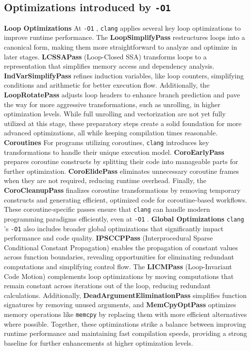 \documentclass{rapport}
\newcommand{\clang}{\texttt{clang} }
\newcommand{\optione}{\texttt{-O1} }
\begin{document}
\subsection*{Optimizations introduced by \optione}
\textbf{Loop Optimizations} \newline
At \optione, \clang applies several key loop optimizations to improve runtime performance. The \textbf{LoopSimplifyPass} restructures loops into a canonical form, making them more 
straightforward to analyze and optimize in later stages. \textbf{LCSSAPass} (Loop-Closed SSA) transforms loops to a representation that simplifies memory access and dependency analysis. 
\textbf{IndVarSimplifyPass} refines induction variables, like loop counters, simplifying conditions and arithmetic for better execution flow. Additionally, the \textbf{LoopRotatePass} 
adjusts loop headers to enhance branch prediction and pave the way for more aggressive transformations, such as unrolling, in higher optimization levels. 
While full unrolling and vectorization are not yet fully utilized at this stage, these preparatory steps create a solid foundation for more advanced optimizations, 
all while keeping compilation times reasonable.
\newline\newline
\textbf{Coroutines}\newline
For programs utilizing coroutines, \clang introduces key transformations to handle their unique execution model. 
\textbf{CoroEarlyPass} prepares coroutine constructs by splitting their code into manageable parts for further optimization. 
\textbf{CoroElidePass} eliminates unnecessary coroutine frames when they are not required, reducing runtime overhead. 
Finally, the \textbf{CoroCleanupPass} finalizes coroutine transformations by removing temporary constructs and generating efficient, optimized code for 
coroutine-based workflows. These coroutine-specific passes ensure that \clang can handle modern programming paradigms efficiently, even at \optione.
\newline\newline
\textbf{Global Optimizations}\newline
\clang’s \optione also includes broader global optimizations that significantly impact performance and code quality. \textbf{IPSCCPPass} (Interprocedural Sparse Conditional Constant Propagation) 
enables the propagation of constant values across function boundaries, revealing opportunities for eliminating redundant computations and simplifying control flow. 
The \textbf{LICMPass} (Loop-Invariant Code Motion) complements loop optimizations by moving computations that remain constant across iterations out of the loop, reducing redundant calculations. 
Additionally, \textbf{DeadArgumentEliminationPass} simplifies function signatures by removing unused arguments, and \textbf{MemCpyOptPass} optimizes memory operations like \texttt{memcpy} 
by replacing them with more efficient alternatives where possible. Together, these optimizations strike a balance between improving runtime performance and maintaining fast compilation 
speeds, providing a strong baseline for further enhancements at higher optimization levels.
\end{document}
